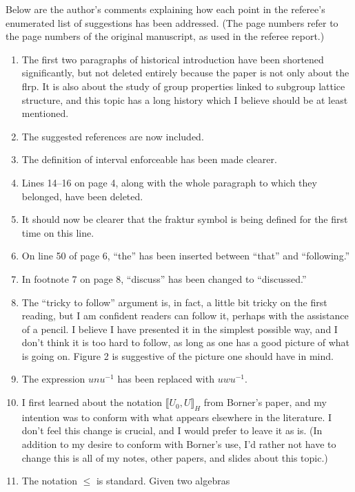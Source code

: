 \documentclass{article}
\newcommand{\lb}{\ensuremath{\llbracket}}
\newcommand{\rb}{\ensuremath{\rrbracket}}
\begin{document}
\vskip1cm
Below are the author's comments explaining how each point in the referee's
enumerated list of suggestions has been addressed.  (The page numbers refer
to the page numbers of the original manuscript, as used in the referee report.)
\begin{enumerate}[(1)]
\item The first two paragraphs of historical introduction have been
  shortened significantly, but not deleted entirely because the paper is not
  only about the \acs{flrp}.  It is also about the study of group properties
  linked to subgroup lattice structure, and this topic has a long history which
  I believe should be at least mentioned.
\item The suggested references are now included.
\item The definition of interval enforceable has been made clearer.
\item Lines 14--16 on page 4, along with the whole paragraph to which they
  belonged, have been deleted.
\item It should now be clearer that the fraktur symbol is being defined for the first
  time on this line.
\item On line 50 of page 6, ``the'' has been inserted between ``that'' and
  ``following.''
\item In footnote 7 on page 8, ``discuss'' has been changed to ``discussed.''
\item The ``tricky to follow'' argument is, in fact, a little bit tricky on the 
  first reading, but I am confident readers can follow it, perhaps with the
  assistance of a pencil.  I believe I have presented it in the simplest
  possible way, and I don't think it is too hard to follow, as long as
  one has a good picture of what is going on. Figure 2 is suggestive of the
  picture one should have in mind.
\item The expression $unu^{-1}$ has been replaced with $uwu^{-1}$.
\item I first learned about the notation $\lb U_0, U \rb_H$ from Borner's paper,
  and my intention was to conform with what appears elsewhere in the literature. I
  don't feel this change is crucial, and I would prefer to leave it as is.
  (In addition to my desire to conform with Borner's use, I'd rather not 
  have to change this is all of my notes, other papers, and slides about this
  topic.) 
\item The notation $\leq$ is standard. Given two algebras

\end{enumerate}
\end{document}
